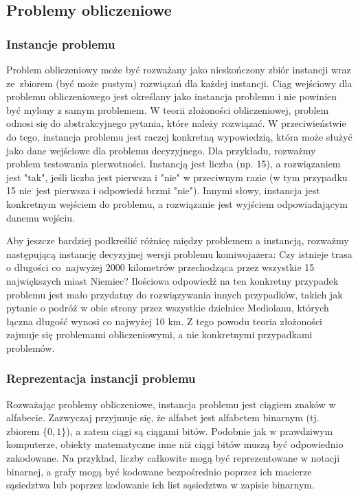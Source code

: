 	\subsection{Problemy obliczeniowe}

		\subsubsection{Instancje problemu}
Problem obliczeniowy może być rozważany jako nieskończony zbiór instancji wraz ze~zbiorem (być może pustym) rozwiązań dla każdej instancji. Ciąg wejściowy dla problemu obliczeniowego jest określany jako instancja problemu i nie powinien być mylony z samym problemem. W teorii złożoności obliczeniowej, problem odnosi się do abstrakcyjnego pytania, które należy rozwiązać. W przeciwieństwie do tego, instancja problemu jest raczej konkretną wypowiedzią, która może służyć jako dane wejściowe dla problemu decyzyjnego. Dla przykładu, rozważmy problem testowania pierwotności. Instancją jest liczba (np. 15), a rozwiązaniem jest "tak", jeśli liczba jest pierwsza i "nie" w przeciwnym razie (w tym przypadku 15 nie~jest pierwsza i odpowiedź brzmi "nie"). Innymi słowy, instancja jest konkretnym wejściem do problemu, a rozwiązanie jest wyjściem odpowiadającym danemu wejściu.

Aby jeszcze bardziej podkreślić różnicę między problemem a instancją, rozważmy następującą instancję decyzyjnej wersji problemu komiwojażera: Czy istnieje trasa o długości co~najwyżej 2000 kilometrów przechodząca przez wszystkie 15 największych miast Niemiec? Ilościowa odpowiedź na ten konkretny przypadek problemu jest mało przydatny do rozwiązywania innych przypadków, takich jak pytanie o podróż w obie strony przez wszystkie dzielnice Mediolanu, których łączna długość wynosi co najwyżej 10 km. Z tego powodu teoria złożoności zajmuje się problemami obliczeniowymi, a nie konkretnymi przypadkami problemów.

		\subsubsection{Reprezentacja instancji problemu}

Rozważając problemy obliczeniowe, instancja problemu jest ciągiem znaków w alfabecie. Zazwyczaj przyjmuje się, że alfabet jest alfabetem binarnym (tj. zbiorem $\{0,1\}$), a zatem ciągi są ciągami bitów. Podobnie jak w prawdziwym komputerze, obiekty matematyczne inne niż ciągi bitów muszą być odpowiednio zakodowane. Na przykład, liczby całkowite mogą być reprezentowane w notacji binarnej, a grafy mogą być kodowane bezpośrednio poprzez ich macierze sąsiedztwa lub poprzez kodowanie ich list sąsiedztwa w zapisie binarnym.

